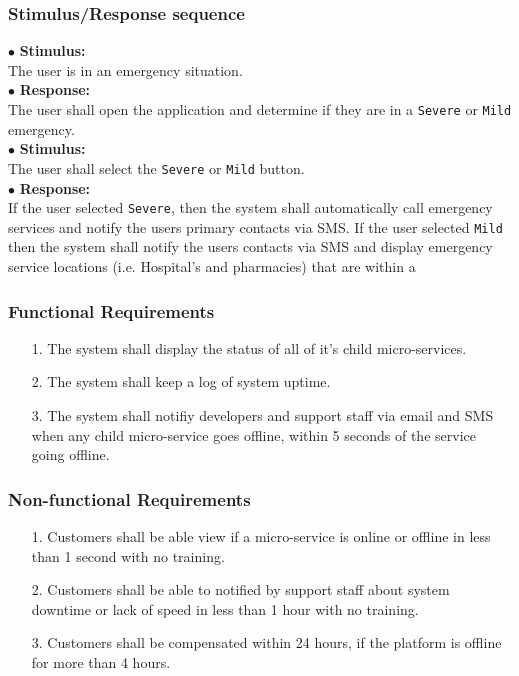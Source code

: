 \documentclass{scrreprt}
\begin{document}
\subsubsection{Stimulus/Response sequence}
\vspace{5mm}
	$\bullet$ \textbf{Stimulus:} \\ \hspace{5mm} The user is in an emergency situation. \\
	$\bullet$ \textbf{Response:} \\ \hspace{5mm} The user shall open the application and determine if they are in a \texttt{Severe} or \texttt{Mild} emergency.
\vspace{5mm}\\
	\hspace{-4.75mm} $\bullet$ \textbf{Stimulus:} \\ \hspace{5mm} The user shall select the \texttt{Severe} or \texttt{Mild} button.\\
	$\bullet$ \textbf{Response:} \\ \hspace{5mm} If the user selected \texttt{Severe}, then the system shall automatically call emergency services and notify the users primary contacts via SMS. If the user selected \texttt{Mild} then the system shall notify the users contacts via SMS and display emergency service locations (i.e. Hospital's and pharmacies) that are within a 
\\
\subsubsection{Functional Requirements}
\begin{enumerate}
	\item[1.] The system shall display the status of all of it's child micro-services.
	\item[2.] The system shall keep a log of system uptime.
	\item[3.] The system shall notifiy developers and support staff via email and SMS when any child micro-service goes offline, within 5 seconds of the service going offline.
\end{enumerate}

\subsubsection{Non-functional Requirements}
\begin{enumerate}
	\item[1.] Customers shall be able view if a micro-service is online or offline in less than 1 second with no training.
	\item[2.] Customers shall be able to notified by support staff about system downtime or lack of speed in less than 1 hour with no training.
	\item[3.] Customers shall be compensated within 24 hours, if the platform is offline for more than 4 hours.
\end{enumerate}
\end{document}
